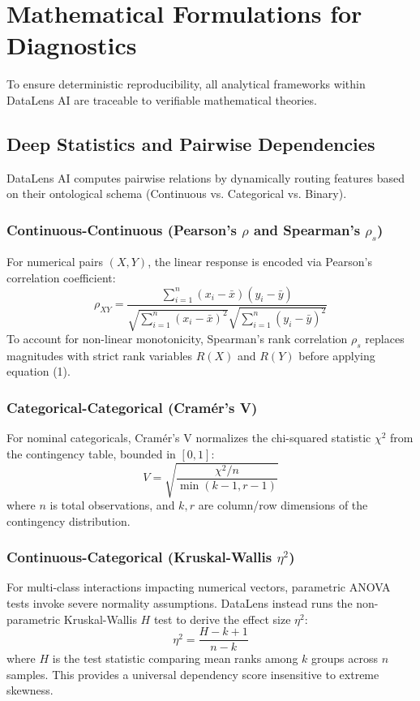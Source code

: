 \documentclass[conference]{IEEEtran}
\begin{document}
\section{Mathematical Formulations for Diagnostics}\label{sec:methods}
To ensure deterministic reproducibility, all analytical frameworks within DataLens AI are traceable to verifiable mathematical theories. 

\subsection{Deep Statistics and Pairwise Dependencies}
DataLens AI computes pairwise relations by dynamically routing features based on their ontological schema (Continuous vs. Categorical vs. Binary).

\subsubsection{Continuous-Continuous (Pearson's $\rho$ and Spearman's $\rho_s$)}
For numerical pairs $(X,Y)$, the linear response is encoded via Pearson's correlation coefficient:
\begin{equation}
    \rho_{XY} = \frac{\sum_{i=1}^n (x_i - \bar{x})(y_i - \bar{y})}{\sqrt{\sum_{i=1}^n (x_i - \bar{x})^2} \sqrt{\sum_{i=1}^n (y_i - \bar{y})^2}}
\end{equation}
To account for non-linear monotonicity, Spearman's rank correlation $\rho_s$ replaces magnitudes with strict rank variables $R(X)$ and $R(Y)$ before applying equation (1).

\subsubsection{Categorical-Categorical (Cram\'er's V)}
For nominal categoricals, Cram\'er's V normalizes the chi-squared statistic $\chi^2$ from the contingency table, bounded in $[0,1]$:
\begin{equation}
    V = \sqrt{\frac{\chi^2 / n}{\min(k-1, r-1)}}
\end{equation}
where $n$ is total observations, and $k, r$ are column/row dimensions of the contingency distribution.

\subsubsection{Continuous-Categorical (Kruskal-Wallis $\eta^2$)}
For multi-class interactions impacting numerical vectors, parametric ANOVA tests invoke severe normality assumptions. DataLens instead runs the non-parametric Kruskal-Wallis $H$ test to derive the effect size $\eta^2$:
\begin{equation}
    \eta^2 = \frac{H - k + 1}{n - k}
\end{equation}
where $H$ is the test statistic comparing mean ranks among $k$ groups across $n$ samples. This provides a universal dependency score insensitive to extreme skewness.
\end{document}
